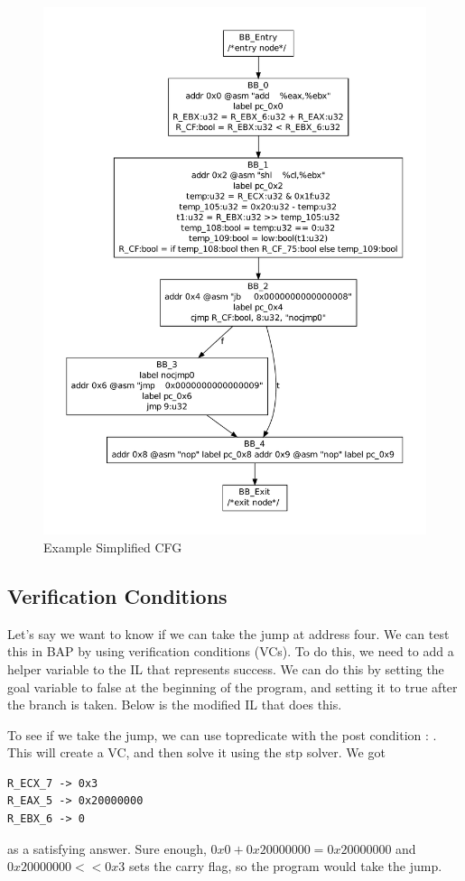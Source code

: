 \begin{figure}[p]
  \begin{center}
    \includegraphics[height=.9\textheight]{chap-examples/cfg_simp.pdf}
  \end{center}
  \caption{Example Simplified CFG}
  \label{fig:cfgsimp}
\end{figure}
\FloatBarrier

\subsection{Verification Conditions}

Let's say we want to know if we can take the jump at address four.  We
can test this in BAP by using verification conditions (VCs).  To do
this, we need to add a helper variable to the IL that represents
success.  We can do this by setting the goal variable to false at the
beginning of the program, and setting it to true after the branch is
taken.  Below is the modified IL that does this.



To see if we take the jump, we can use topredicate with the post
condition : .  This will create a VC, and then solve it
using the stp solver.  We got
\begin{verbatim}
R_ECX_7 -> 0x3
R_EAX_5 -> 0x20000000
R_EBX_6 -> 0
\end{verbatim}
as a satisfying answer. Sure enough, $0x0 + 0x20000000 = 0x20000000$
and $0x20000000 << 0x3$ sets the carry flag, so the program would take the jump.
